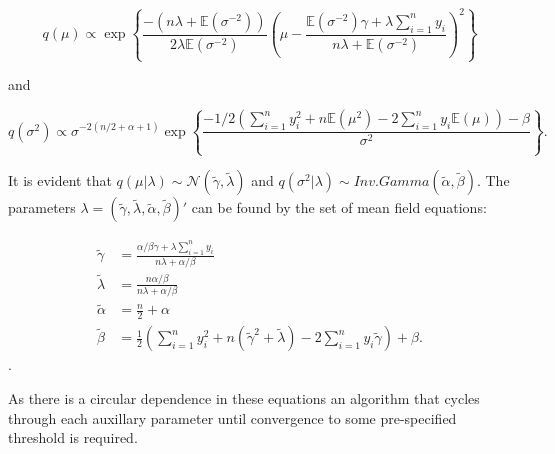 \documentclass[12pt,a4paper]{article}%
\numberwithin{equation}{section}
\begin{document}
\begin{equation}
\label{mf3}
q(\mu) \propto \exp \left\{ \frac{-(n\lambda + \mathbb{E}(\sigma^{-2}))}{2\lambda\mathbb{E}(\sigma^{-2})} \left( \mu - \frac{\mathbb{E}(\sigma^{-2})\gamma + \lambda \sum_{i=1}^{n} y_i}{n \lambda + \mathbb{E}(\sigma^{-2})} \right)^2 \right\}
\end{equation}

and

\begin{equation}
\label{mf4}
q(\sigma^2) \propto \sigma^{-2(n/2 + \alpha + 1)} \exp \left\{ \frac{ -1/2(\sum_{i=1}^{n}y_i^2 + n\mathbb{E}(\mu^2) - 2\sum_{i=1}^{n} y_i \mathbb{E}(\mu)) - \beta}{\sigma^2} \right\}.
\end{equation}

It is evident that $q(\mu | \lambda) \sim \mathcal{N}(\tilde{\gamma}, \tilde{\lambda})$ and $q(\sigma^2 | \lambda) \sim Inv.Gamma(\tilde{\alpha}, \tilde{\beta})$. The parameters $\lambda = (\tilde{\gamma}, \tilde{\lambda}, \tilde{\alpha}, \tilde{\beta})'$ can be found 
by the set of mean field equations:

\begin{align}
\tilde{\gamma} &= \frac{\alpha / \beta \gamma + \lambda \sum_{i=1}^{n} y_i} {n \lambda + \alpha / \beta} \label{mf5} \\ 
\tilde{\lambda} &= \frac{n \alpha / \beta}{n \lambda + \alpha / \beta} \\
\tilde{\alpha} &= \frac{n}{2} + \alpha \\
\tilde{\beta} &= \frac{1}{2} \left(\sum_{i=1}^{n} y_i^2 + n(\tilde{\gamma}^2 + \tilde{\lambda}) - 2 \sum_{i=1}^{n} y_i \tilde{\gamma} \right) + \beta. \label{mf6}
\end{align}.

As there is a circular dependence in these equations an algorithm that cycles through each auxillary %
parameter until convergence to some pre-specified threshold %
is required.

\end{document}
